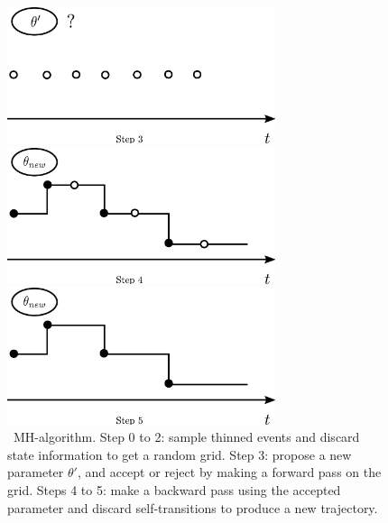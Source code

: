 \begin{figure}[H]
  \begin{minipage}[!hp]{0.45\linewidth}
  \centering
    \includegraphics [width=0.70\textwidth, angle=0]{figs/plotn3.pdf}
    \vspace{-0 in}
  \end{minipage}
  \begin{minipage}[!hp]{0.45\linewidth}
  \centering
    \includegraphics [width=0.70\textwidth, angle=0]{figs/plotn4.pdf}
    \vspace{-0 in}
  \end{minipage}
  \begin{minipage}[!hp]{0.45\linewidth}
  \centering
    \includegraphics [width=0.70\textwidth, angle=0]{figs/plotn5.pdf}
    \vspace{-0 in}
  \end{minipage}
  \caption{\Naive\ MH-algorithm. Step 0 to 2: sample thinned events
  and discard state information to get a random grid. Step 3: 
propose a new parameter $\theta'$, and accept or reject by making
a forward pass on the grid. Steps 4 to 5: make a backward pass using
the accepted parameter and discard self-transitions to produce a new
trajectory.}
   \label{fig:naive_mh}

  \end{figure}

